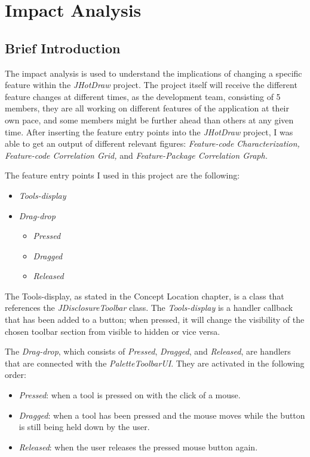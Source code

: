 \section{Impact Analysis}
\subsection{Brief Introduction}
The impact analysis is used to understand the implications of changing a specific feature within the \textit{JHotDraw} project.
The project itself will receive the different feature changes at different times, as the development team, consisting of 5 members,
they are all working on different features of the application at their own pace, and some members might be further ahead than others at any given time.
After inserting the feature entry points into the \textit{JHotDraw} project, I was able to get an output of different relevant figures: \textit{Feature-code Characterization,}
\textit{Feature-code Correlation Grid,} and \textit{Feature-Package Correlation Graph.}

The feature entry points I used in this project are the following:
\begin{itemize}
    \item \textit{Tools-display}
    \item \textit{Drag-drop}
          \begin{itemize}
              \item \textit{Pressed}
              \item \textit{Dragged}
              \item \textit{Released}
          \end{itemize}
\end{itemize}

The \textit{}Tools-display, as stated in the \textit{}Concept Location chapter, is a class that references the \textit{JDisclosureToolbar} class. The \textit{Tools-display} is a handler callback that has been added to a button;
when pressed, it will change the visibility of the chosen toolbar section from visible to hidden or vice versa.

The \textit{Drag-drop}, which consists of \textit{Pressed}, \textit{Dragged}, and \textit{Released}, are handlers that are connected with the \textit{PaletteToolbarUI}. They are activated in the following order:
\begin{itemize}
    \item \textit{Pressed}: when a tool is pressed on with the click of a mouse.
    \item \textit{Dragged}: when a tool has been pressed and the mouse moves while the button is still being held down by the user.
    \item \textit{Released}: when the user releases the pressed mouse button again.
\end{itemize}
